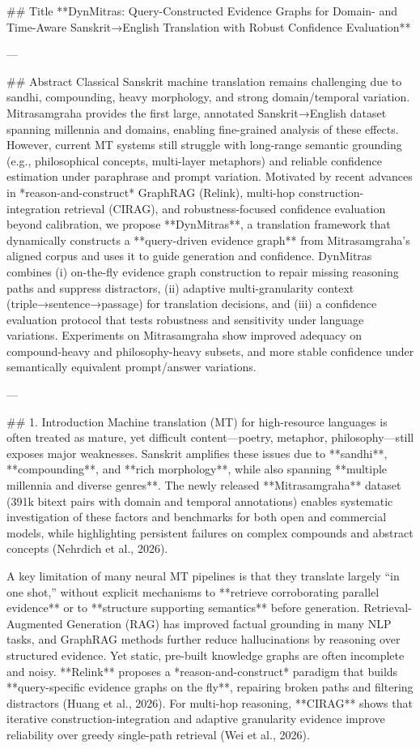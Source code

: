 ## Title  
**DynMitras: Query-Constructed Evidence Graphs for Domain- and Time-Aware Sanskrit→English Translation with Robust Confidence Evaluation**

---

## Abstract  
Classical Sanskrit machine translation remains challenging due to sandhi, compounding, heavy morphology, and strong domain/temporal variation. Mitrasamgraha provides the first large, annotated Sanskrit→English dataset spanning millennia and domains, enabling fine-grained analysis of these effects. However, current MT systems still struggle with long-range semantic grounding (e.g., philosophical concepts, multi-layer metaphors) and reliable confidence estimation under paraphrase and prompt variation. Motivated by recent advances in *reason-and-construct* GraphRAG (Relink), multi-hop construction-integration retrieval (CIRAG), and robustness-focused confidence evaluation beyond calibration, we propose **DynMitras**, a translation framework that dynamically constructs a **query-driven evidence graph** from Mitrasamgraha’s aligned corpus and uses it to guide generation and confidence. DynMitras combines (i) on-the-fly evidence graph construction to repair missing reasoning paths and suppress distractors, (ii) adaptive multi-granularity context (triple→sentence→passage) for translation decisions, and (iii) a confidence evaluation protocol that tests robustness and sensitivity under language variations. Experiments on Mitrasamgraha show improved adequacy on compound-heavy and philosophy-heavy subsets, and more stable confidence under semantically equivalent prompt/answer variations.

---

## 1. Introduction  
Machine translation (MT) for high-resource languages is often treated as mature, yet difficult content—poetry, metaphor, philosophy—still exposes major weaknesses. Sanskrit amplifies these issues due to **sandhi**, **compounding**, and **rich morphology**, while also spanning **multiple millennia and diverse genres**. The newly released **Mitrasamgraha** dataset (391k bitext pairs with domain and temporal annotations) enables systematic investigation of these factors and benchmarks for both open and commercial models, while highlighting persistent failures on complex compounds and abstract concepts (Nehrdich et al., 2026).

A key limitation of many neural MT pipelines is that they translate largely “in one shot,” without explicit mechanisms to **retrieve corroborating parallel evidence** or to **structure supporting semantics** before generation. Retrieval-Augmented Generation (RAG) has improved factual grounding in many NLP tasks, and GraphRAG methods further reduce hallucinations by reasoning over structured evidence. Yet static, pre-built knowledge graphs are often incomplete and noisy. **Relink** proposes a *reason-and-construct* paradigm that builds **query-specific evidence graphs on the fly**, repairing broken paths and filtering distractors (Huang et al., 2026). For multi-hop reasoning, **CIRAG** shows that iterative construction-integration and adaptive granularity evidence improve reliability over greedy single-path retrieval (Wei et al., 2026).

